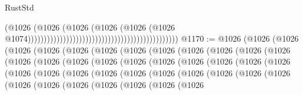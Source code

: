 \begin{lexlean}{RustStd}
\begin{coremodule}
{\begin{coremodule}
{{{{{{{{{{{{{{{{{{{{{{{{{{{{{{{{{{{{{                                                                                      (@1026
                                                                                        (@1026
                                                                                          (@1026
                                                                                            (@1026
                                                                                              (@1026
                                                                                                (@1026
                                                                                                  @1074)))))))))))))))))))))))))))))))))))))))))))))))
@1170 := @1026
    (@1026
      (@1026
        (@1026
          (@1026
            (@1026
              (@1026
                (@1026
                  (@1026
                    (@1026
                      (@1026
                        (@1026
                          (@1026
                            (@1026
                              (@1026
                                (@1026
                                  (@1026
                                    (@1026
                                      (@1026
                                        (@1026
                                          (@1026
                                            (@1026
                                              (@1026
                                                (@1026
                                                  (@1026
                                                    (@1026
                                                      (@1026
                                                        (@1026
                                                          (@1026
                                                            (@1026
                                                              (@1026
                                                                (@1026
                                                                  (@1026
                                                                    (@1026
                                                                      (@1026
                                                                        (@1026
                                                                          (@1026
                                                                            (@1026
                                                                              (@1026
                                                                                (@1026
}}}}}}}}}}}}}}}}}}}}}}}}}}}}}}}}}}}}}
\end{coremodule}}
\end{coremodule}
\end{lexlean}
